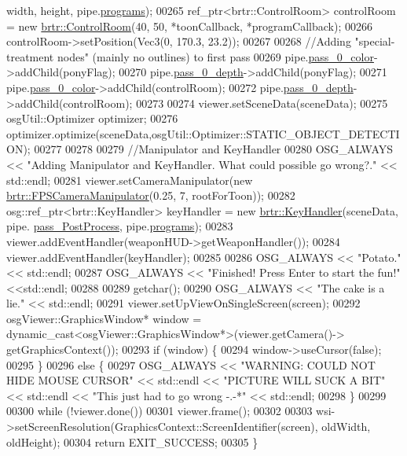 \begin{DoxyCode}
      width, height, pipe.\hyperlink{structbrtr_1_1_rendering_pipeline_afe773fb98986d39ef23a4edf3634af10}{programs});
00265     ref\_ptr<brtr::ControlRoom> controlRoom = \textcolor{keyword}{new} \hyperlink{classbrtr_1_1_control_room}{brtr::ControlRoom}(40, 50, *toonCallback, 
      *programCallback);
00266     controlRoom->setPosition(Vec3(0, 170.3, 23.2));
00267 
00268     \textcolor{comment}{//Adding "special-treatment nodes" (mainly no outlines) to first pass}
00269     pipe.\hyperlink{structbrtr_1_1_rendering_pipeline_ae945030321a6b44f00266954c8c50bf3}{pass\_0\_color}->addChild(ponyFlag);
00270     pipe.\hyperlink{structbrtr_1_1_rendering_pipeline_a18752632c1b557d283e523ebbc0443a0}{pass\_0\_depth}->addChild(ponyFlag);
00271     pipe.\hyperlink{structbrtr_1_1_rendering_pipeline_ae945030321a6b44f00266954c8c50bf3}{pass\_0\_color}->addChild(controlRoom);
00272     pipe.\hyperlink{structbrtr_1_1_rendering_pipeline_a18752632c1b557d283e523ebbc0443a0}{pass\_0\_depth}->addChild(controlRoom);
00273 
00274     viewer.setSceneData(sceneData);
00275     osgUtil::Optimizer optimizer;
00276     optimizer.optimize(sceneData,osgUtil::Optimizer::STATIC\_OBJECT\_DETECTION);
00277     
00278 
00279     \textcolor{comment}{//Manipulator and KeyHandler}
00280     OSG\_ALWAYS << \textcolor{stringliteral}{"Adding Manipulator and KeyHandler. What could possible go wrong?."} << std::endl;
00281     viewer.setCameraManipulator(\textcolor{keyword}{new} \hyperlink{classbrtr_1_1_f_p_s_camera_manipulator}{brtr::FPSCameraManipulator}(0.25, 7, 
      rootForToon));
00282     osg::ref\_ptr<brtr::KeyHandler> keyHandler = \textcolor{keyword}{new} \hyperlink{classbrtr_1_1_key_handler}{brtr::KeyHandler}(sceneData, pipe.
      \hyperlink{structbrtr_1_1_rendering_pipeline_aea2228e41f1e5c6db5d616c05ecc27fd}{pass\_PostProcess}, pipe.\hyperlink{structbrtr_1_1_rendering_pipeline_afe773fb98986d39ef23a4edf3634af10}{programs});
00283     viewer.addEventHandler(weaponHUD->getWeaponHandler());
00284     viewer.addEventHandler(keyHandler);
00285 
00286     OSG\_ALWAYS << \textcolor{stringliteral}{"Potato."} << std::endl;
00287     OSG\_ALWAYS << \textcolor{stringliteral}{"Finished! Press Enter to start the fun!"} <<std::endl;
00288  
00289     getchar();
00290     OSG\_ALWAYS << \textcolor{stringliteral}{"The cake is a lie."} << std::endl;
00291     viewer.setUpViewOnSingleScreen(screen);
00292     osgViewer::GraphicsWindow* window = \textcolor{keyword}{dynamic\_cast<}osgViewer::GraphicsWindow*\textcolor{keyword}{>}(viewer.getCamera()->
      getGraphicsContext());
00293     \textcolor{keywordflow}{if} (window) \{
00294         window->useCursor(\textcolor{keyword}{false});
00295     \}
00296     \textcolor{keywordflow}{else} \{
00297         OSG\_ALWAYS << \textcolor{stringliteral}{"WARNING: COULD NOT HIDE MOUSE CURSOR"} << std::endl << \textcolor{stringliteral}{"PICTURE WILL SUCK A BIT"} << 
      std::endl << \textcolor{stringliteral}{"This just had to go wrong -.-*"} << std::endl;
00298     \}
00299 
00300     \textcolor{keywordflow}{while} (!viewer.done())
00301         viewer.frame();
00302  
00303     wsi->setScreenResolution(GraphicsContext::ScreenIdentifier(screen), oldWidth, oldHeight);
00304     \textcolor{keywordflow}{return} EXIT\_SUCCESS;
00305 \}
\end{DoxyCode}
